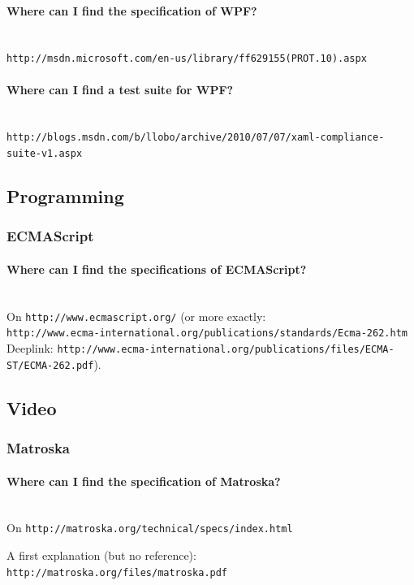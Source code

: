 \documentclass[10pt]{scrbook}
\begin{document}
\paragraph{Where can I find the specification of WPF?} ~ \\
\verb|http://msdn.microsoft.com/en-us/library/ff629155(PROT.10).aspx|

\paragraph{Where can I find a test suite for WPF?} ~ \\
\verb|http://blogs.msdn.com/b/llobo/archive/2010/07/07/xaml-compliance-suite-v1.aspx|

\subsection{Programming}

\subsubsection{ECMAScript}

\paragraph{Where can I find the specifications of ECMAScript?} ~ \\
On \verb|http://www.ecmascript.org/| (or more exactly: \\
\verb|http://www.ecma-international.org/publications/standards/Ecma-262.htm| \\
Deeplink: \verb|http://www.ecma-international.org/publications/files/ECMA-ST/ECMA-262.pdf|).

\subsection{Video}

\subsubsection{Matroska}

\paragraph{Where can I find the specification of Matroska?} ~ \\
On \verb|http://matroska.org/technical/specs/index.html|

A first explanation (but no reference): \verb|http://matroska.org/files/matroska.pdf|
\end{document}
